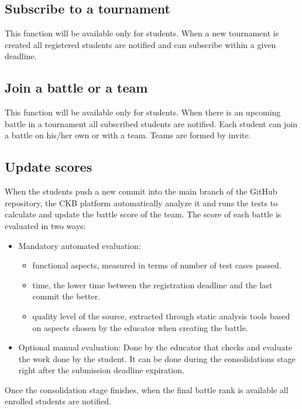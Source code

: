 \subsection{Subscribe to a tournament}
This function will be available only for students. \newline When a new tournament is created all registered students are notified and can subscribe within a given deadline.


\subsection{Join a battle or a team}
This function will be available only for students. \newline When there is an upcoming battle in a tournament all subscribed students are notified. Each student can join a battle on his/her own or with a team. Teams are formed by invite.

\subsection{Update scores}
When the students push a new commit into the main branch of the GitHub repository, the CKB platform automatically analyze it and runs the tests to calculate and update the battle score of the team.\newline
The score of each battle is evaluated in two ways:
\begin{itemize}
    \item Mandatory automated evaluation:
        \begin{itemize}
            \item functional aspects, measured in terms of number of test cases passed.
            \item time, the lower time between the registration deadline and the last commit the better.
            \item quality level of the source, extracted through static analysis tools based on aspects chosen by the educator when creating the battle.
        \end{itemize}
    \item Optional manual evaluation:
        Done by the educator that checks and evaluate the work done by the student. It can be done during the consolidations stage right after the submission deadline expiration.
\end{itemize}
Once the consolidation stage finishes, when the final battle rank is available all enrolled students are notified.

